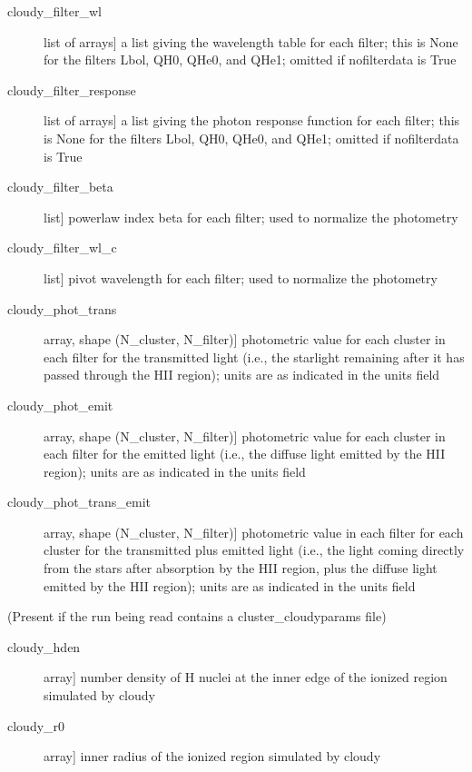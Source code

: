 \documentclass[letterpaper,10pt,english]{sphinxmanual}
\begin{document}
\begin{fulllineitems}
\begin{description}
\begin{description}
\item[{cloudy\_filter\_wl}] \leavevmode{[}list of arrays{]}
a list giving the wavelength table for each filter; this is
None for the filters Lbol, QH0, QHe0, and QHe1; omitted if
nofilterdata is True

\item[{cloudy\_filter\_response}] \leavevmode{[}list of arrays{]}
a list giving the photon response function for each filter;
this is None for the filters Lbol, QH0, QHe0, and QHe1; omitted
if nofilterdata is True

\item[{cloudy\_filter\_beta}] \leavevmode{[}list{]}
powerlaw index beta for each filter; used to normalize the
photometry

\item[{cloudy\_filter\_wl\_c}] \leavevmode{[}list{]}
pivot wavelength for each filter; used to normalize the photometry

\item[{cloudy\_phot\_trans}] \leavevmode{[}array, shape (N\_cluster, N\_filter){]}
photometric value for each cluster in each filter for the
transmitted light (i.e., the starlight remaining after it has
passed through the HII region); units are as indicated in
the units field

\item[{cloudy\_phot\_emit}] \leavevmode{[}array, shape (N\_cluster, N\_filter){]}
photometric value for each cluster in each filter for the
emitted light (i.e., the diffuse light emitted by the HII
region); units are as indicated in the units field

\item[{cloudy\_phot\_trans\_emit}] \leavevmode{[}array, shape (N\_cluster, N\_filter){]}
photometric value in each filter for each cluster for the
transmitted plus emitted light (i.e., the light coming
directly from the stars after absorption by the HII region,
plus the diffuse light emitted by the HII region); units are as
indicated in the units field

\end{description}

(Present if the run being read contains a cluster\_cloudyparams file)
\begin{description}
\item[{cloudy\_hden}] \leavevmode{[}array{]}
number density of H nuclei at the inner edge of the ionized
region simulated by cloudy

\item[{cloudy\_r0}] \leavevmode{[}array{]}
inner radius of the ionized region simulated by cloudy


\end{description}
\end{description}
\end{fulllineitems}
\end{document}
